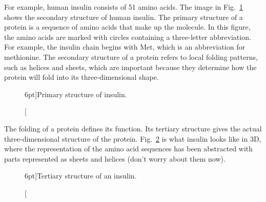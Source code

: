 For example, human insulin consists of 51 amino acids. The image in Fig.~\ref{fig:insulin-secondary} shows the secondary structure of human insulin. The primary structure of a protein is a sequence of amino acids that make up the molecule. In this figure, the amino acids are marked with circles containing a three-letter abbreviation. For example, the insulin chain begins with Met, which is an abbreviation for methionine. The secondary structure of a protein refers to local folding patterns, such as helices and sheets, which are important because they determine how the protein will fold into its three-dimensional shape.

\begin{figure}
    \caption[][6pt]{Primary structure of insulin.}
    \label{fig:insulin-secondary}
\end{figure}

The folding of a protein defines its function. Its tertiary structure gives the actual three-dimensional structure of the protein. Fig.~\ref{fig:insulin-3d} is what insulin looks like in 3D, where the representation of the amino acid sequences has been abstracted with parts represented as sheets and helices (don't worry about them now).

\begin{figure}
    \caption[][6pt]{Tertiary structure of an insulin.}
    \label{fig:insulin-3d}
\end{figure}

